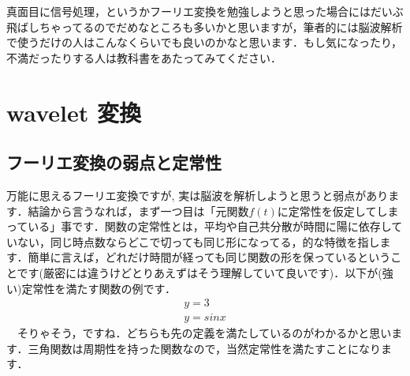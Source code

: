 \documentclass[11pt,a4paper]{ujreport} 	%
\begin{document}
真面目に信号処理，というかフーリエ変換を勉強しようと思った場合にはだいぶ飛ばしちゃってるのでだめなところも多いかと思いますが，筆者的には脳波解析で使うだけの人はこんなくらいでも良いのかなと思います．もし気になったり，不満だったりする人は教科書をあたってみてください．
\chapter{wavelet 変換}
\section{フーリエ変換の弱点と定常性}
万能に思えるフーリエ変換ですが, 実は脳波を解析しようと思うと弱点があります．結論から言うなれば，まず一つ目は「元関数$f(t)$に定常性を仮定してしまっている」事です．関数の定常性とは，平均や自己共分散が時間に陽に依存していない，同じ時点数ならどこで切っても同じ形になってる，的な特徴を指します．簡単に言えば，どれだけ時間が経っても同じ関数の形を保っているということです(厳密には違うけどとりあえずはそう理解していて良いです)．以下が(強い)定常性を満たす関数の例です．
\begin{eqnarray}
y = 3\\
y = sinx
\end{eqnarray}
　そりゃそう，ですね．どちらも先の定義を満たしているのがわかるかと思います．三角関数は周期性を持った関数なので，当然定常性を満たすことになります．\\ \\
\end{document}
